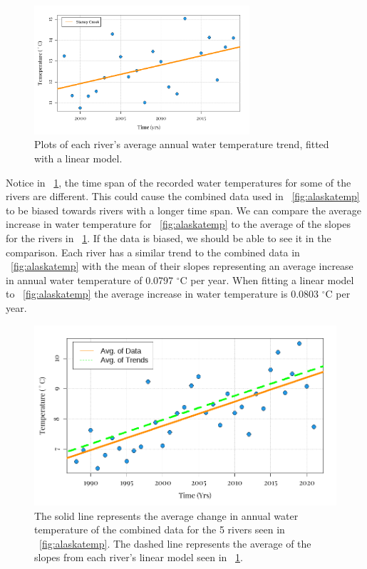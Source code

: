 \begin{figure}[H]
    \centering
    \includegraphics[width=8cm]{Pictures/SST/sst - staney.png}
    \caption{\singlespacing
    Plots of each river's average annual water temperature trend, fitted with a linear model.}\label{fig:sstrivers}
\end{figure}
Notice in \figureautorefname~\ref{fig:sstrivers}, the time span of the recorded water temperatures for some of the rivers are different.
This could cause the combined data used in \figureautorefname~\ref{fig:alaskatemp} to be biased towards rivers with a longer time span.
We can compare the average increase in water temperature for \figureautorefname~\ref{fig:alaskatemp} to the average of the slopes for the rivers in \figureautorefname~\ref{fig:sstrivers}. If the data is biased, we should be able to see it in the comparison.
Each river has a similar trend to the combined data in \figureautorefname~\ref{fig:alaskatemp} with the mean of their slopes representing an average increase in annual water temperature of 0.0797 $^{\circ}$C per year.
When fitting a linear model to \figureautorefname~\ref{fig:alaskatemp} the average increase in water temperature is 0.0803 $^\circ$C per year.
\begin{figure}[H]
    \centering
    \includegraphics[width=14cm]{LaTeX/Pictures/SST/AlaskaWaterFit.png}
    \caption{\singlespacing
    The solid line represents the average change in annual water temperature of the combined data for the 5 rivers seen in \figureautorefname~\ref{fig:alaskatemp}.
    The dashed line represents the average of the slopes from each river's linear model seen in \figureautorefname~\ref{fig:sstrivers}. 
    }
    \label{fig:alaskatempfit}
\end{figure}
